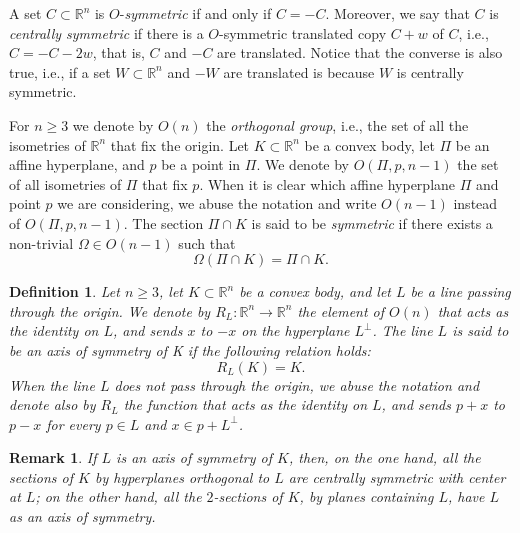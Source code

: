 \documentclass[12pt]{amsart}
\newcommand{\Rn}{\mathbb{R}^{n}}
\newtheorem{remark}{Remark}
\newtheorem{definition}{Definition}
\begin{document}
                    A set $C\subset \Rn$ is $O$-\emph {symmetric} if and only if $C=-C$.  Moreover, 
                    we say that $C$ is \emph{centrally symmetric} if there is a $O$-symmetric 
                    translated copy $C+w$ of $C$, i.e., $C=-C-2w$, that is, $C$ and $-C$ are translated. 
                    Notice that the converse is also true, i.e., if a set $W\subset \Rn$ and $-W$ are 
                    translated is because $W$ is centrally symmetric. 

                    For $n \geq 3$ we denote by $O(n)$ the \textit{orthogonal group}, i.e., the set of all 
                    the isometries of $\Rn$ that fix the origin. Let $K\subset  \Rn$ be a convex body, let 
                    $\Pi$ be an affine hyperplane, and $p$ be a point in $\Pi$. We denote by 
                    $O(\Pi,p,n-1)$ the set of all isometries of $\Pi$ that fix $p$. When it is clear which 
                    affine hyperplane $\Pi$ and point $p$ we are considering, we abuse the notation 
                    and write $O(n - 1)$ instead of $O(\Pi, p, n-1)$. The section $ \Pi\cap K$ is said to 
                    be \textit{symmetric} if there exists a non-trivial $\Omega \in O(n -1)$ such that 
\[
                    \Omega(\Pi \cap K) =  \Pi \cap K.
\]
\begin{definition}
                    Let $n \geq 3$, let $K\subset \Rn$ be a convex body, and let $L$ be a line passing 
                    through the origin. We denote by $R_L : \Rn \rightarrow \Rn$ the element of $O(n)$ 
                    that acts as the identity on $L$, and sends $x$ to $-x$ on the hyperplane 
                    $L^{\perp}$. The line $L$ is said to be an axis of symmetry of K if the following 
                    relation holds:
\[
                    R_L(K) = K.
\]
                    When the line $L$ does not pass through the origin, we abuse the notation and 
                    denote also by $R_L$ the function that acts as the identity on $L$, and sends 
                    $p + x$ to $p - x$ for every $p\in L$ and $x \in p + L^{\perp}$.
\end{definition}
\begin{remark}\label{soul} 
                    If $L$ is an axis of symmetry of $K$, then, on the one hand, all the sections of $K$ 
                    by hyperplanes orthogonal to $L$ are centrally symmetric with center at $L$; on 
                    the other hand, all the $2$-sections of $K$, by planes containing $L$, have $L$ as 
                    an axis of symmetry.
\end{remark} 
\end{document}
